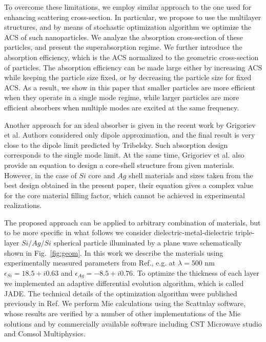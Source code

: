 \documentclass[twoside,twocolumn,9pt]{article}
\begin{document}
To overcome these limitations, we employ similar approach to the one
used for enhancing scattering cross-section.\cite{Fan-2011} In
particular, we propose to use the multilayer structures, and by means
of stochastic optimization algorithm\cite{Jingqiao-JADE-2009} we
optimize the ACS of such nanoparticles. We analyze the absorption
cross-section of these particles, and present the superabsorption
regime. We further introduce the absorption efficiency, which is the
ACS normalized to the geometric cross-section of particles. The absorption efficiency can be made large either by increasing ACS while keeping the particle size fixed, or by decreasing the particle size for fixed ACS. As a result, we show in this paper that smaller particles are more efficient when they operate in a single mode regime, while larger particles are more efficient absorbers when multiple modes are excited at the same frequency. 

Another approach for an ideal absorber is given in the recent work by
Grigoriev et al.\cite{Grigoriev-2015} Authors considered only dipole
approximation, and the final result is very close to the dipole limit
predicted by Tribelsky.\cite{Tribelsky-2011}  Such absorption design
corresponds to the single mode limit.  At the same time, Grigoriev et
al.\cite{Grigoriev-2015} also provide an equation to design a
core-shell structure from given materials. However, in the case of
$Si$ core and $Ag$ shell materials and sizes taken from the best
design obtained in the present paper, their equation gives a complex
value for the core material filling factor, which cannot be achieved
in experimental realizations.

\begin{figure}[h]
\end{figure}

The proposed approach can be applied to arbitrary combination of
materials, but to be more specific in what follows we consider
dielectric-metal-dielectric triple-layer $Si/Ag/Si$ spherical particle
illuminated by a plane wave schematically shown in
Fig.~\ref{fig:geom}. In this work we describe the materials using
experimentally measured parameters from Ref.,\cite{palik-1997}
e.g. at $\lambda = 500$ nm $\epsilon_{Si} = 18.5 + i0.63$ and
$\epsilon_{Ag} = -8.5 + i0.76$.  To optimize the thickness of each
layer we implemented\cite{JADE-web} an adaptive differential
evolution algorithm,\cite{Storn-DE-first-1997} which is called
JADE.\cite{Jingqiao-JADE-2009}  The technical details of the
optimization algorithm were published previously in
Ref.\cite{Ladutenko-2014} We perform Mie calculations using the
Scattnlay software,\cite{Pena-scattnlay-2009,Scattnlay-web} whose
results are verified by a number of other implementations of the Mie
solutions and by commercially available software including CST
Microwave studio\cite{CST-web} and Comsol Multiphysics.\cite{Comsol-web}
\end{document}
